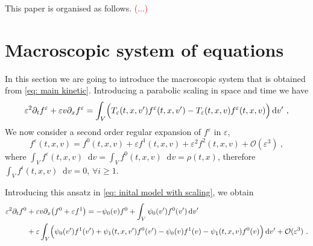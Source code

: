 \documentclass[11pt,twoside]{article}
\newcommand*\diff{\mathop{}\!\mathrm{d}}
\numberwithin{equation}{section}
\newcommand{\e}{\varepsilon}
\begin{document}
This paper is organised as follows. \textcolor{red}{(...)}


\section{Macroscopic system of equations}
In this section we are going to introduce the macroscopic system that is obtained from \eqref{eq: main kinetic}.
Introducing a parabolic scaling in space and time we have
\begin{equation}
    \varepsilon^2 \partial_t f^\varepsilon+\varepsilon{v}\partial_x f^\varepsilon = \int_V\Bigl(T_\varepsilon(t,x,v')f^\varepsilon(t,x,v')-T_\varepsilon(t,x,v)f^\varepsilon(t,x,v)\Bigr)\diff v'\ , \label{eq: inital model with scaling}
\end{equation}
We now consider a second order regular expansion of $f^\e$ in $\varepsilon$, 
\begin{equation*}
f^\e(t,{x},{v})=f^0(t,{x},{v})+\varepsilon f^1(t,{x},{v})+\varepsilon^2 f^2(t,{x},{v})+\mathcal{O}(\varepsilon^3)\ , 
\end{equation*}
where $\int_V f^\e(t,{x},{v})\diff {v} = \int_V f^0(t,{x},{v})\diff {v} = \rho(t,{x})$, therefore $\int_V f^i(t,{x},{v})\diff {v}=0$, $\forall i\geq 1$.






Introducing this ansatz in \eqref{eq: inital model with scaling}, we obtain
\iffalse
{\begin{align*}
    \varepsilon^2\partial_t f^0&+\varepsilon{v}\partial_x\big(f^0+\varepsilon f^1  \big) 
    =-\psi_0(v) f^0+\int_V\psi_0(v')f^0(v')\diff v'\\
    &+\varepsilon\int_V\Bigl(\psi_0(v')f^1(v')+\psi_1(t,x,v')f^0(v')-\psi_0(v)f^1(v)-\psi_1(t,x,v)f^0(v) \Bigr)\diff v'+{\mathcal{O}(\varepsilon^3)}
      \ .
\end{align*}}
\end{document}
